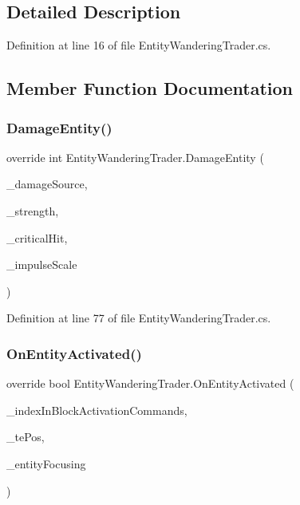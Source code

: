 \subsection{Detailed Description}


Definition at line 16 of file Entity\+Wandering\+Trader.\+cs.



\subsection{Member Function Documentation}
\mbox{\label{class_entity_wandering_trader_a6921d5c83ea2491820dbe7f168141e40}} 
\subsubsection{\texorpdfstring{DamageEntity()}{DamageEntity()}}
{\footnotesize\ttfamily override int Entity\+Wandering\+Trader.\+Damage\+Entity (\begin{DoxyParamCaption}\item[{Damage\+Source}]{\+\_\+damage\+Source,  }\item[{int}]{\+\_\+strength,  }\item[{bool}]{\+\_\+critical\+Hit,  }\item[{float}]{\+\_\+impulse\+Scale }\end{DoxyParamCaption})}



Definition at line 77 of file Entity\+Wandering\+Trader.\+cs.

\mbox{\label{class_entity_wandering_trader_a33a263cf3022eefec249466a4cc2b9bc}} 
\subsubsection{\texorpdfstring{OnEntityActivated()}{OnEntityActivated()}}
{\footnotesize\ttfamily override bool Entity\+Wandering\+Trader.\+On\+Entity\+Activated (\begin{DoxyParamCaption}\item[{int}]{\+\_\+index\+In\+Block\+Activation\+Commands,  }\item[{Vector3i}]{\+\_\+te\+Pos,  }\item[{Entity\+Alive}]{\+\_\+entity\+Focusing }\end{DoxyParamCaption})}



